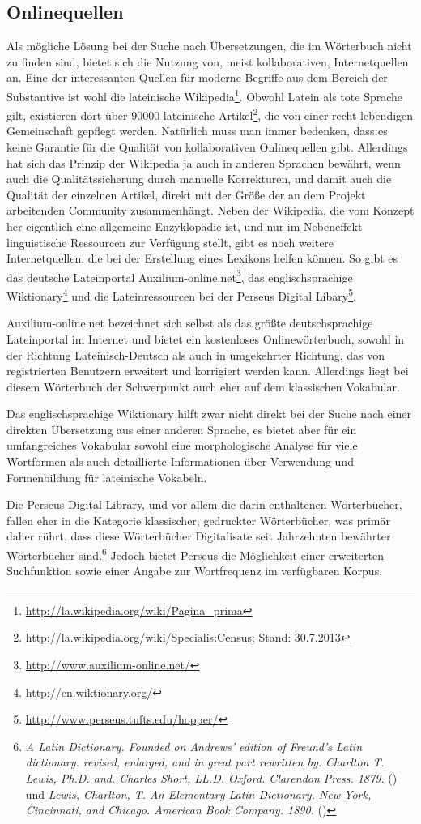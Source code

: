 \subsection{Onlinequellen}
\label{subsec:online}
Als mögliche Lösung bei der Suche nach Übersetzungen, die im Wörterbuch nicht zu finden sind, bietet sich die Nutzung von, meist  kollaborativen, Internetquellen an. Eine der interessanten Quellen für moderne Begriffe aus dem Bereich der Substantive ist wohl die lateinische Wikipedia\footnote{\url{http://la.wikipedia.org/wiki/Pagina\_prima}}. Obwohl Latein als tote Sprache gilt, existieren dort über 90000 lateinische Artikel\footnote{\url{http://la.wikipedia.org/wiki/Specialis:Census}; Stand: 30.7.2013}, die von einer recht lebendigen Gemeinschaft gepflegt werden. Natürlich muss man immer bedenken, dass es keine Garantie für die Qualität von kollaborativen Onlinequellen gibt. Allerdings hat sich das Prinzip der Wikipedia ja auch in anderen Sprachen bewährt, wenn auch die Qualitätssicherung durch manuelle Korrekturen, und damit auch die Qualität der einzelnen Artikel, direkt mit der Größe der an dem Projekt arbeitenden Community zusammenhängt. Neben der Wikipedia, die vom Konzept her eigentlich eine allgemeine Enzyklopädie ist, und nur im Nebeneffekt linguistische Ressourcen zur Verfügung stellt, gibt es noch weitere Internetquellen, die bei der Erstellung eines Lexikons helfen können. So gibt es das deutsche Lateinportal Auxilium-online.net\footnote{\url{http://www.auxilium-online.net/}}, das englischsprachige Wiktionary\footnote{\url{http://en.wiktionary.org/}} und die Lateinressourcen bei der Perseus Digital Libary\footnote{\url{http://www.perseus.tufts.edu/hopper/}}. \par
Auxilium-online.net bezeichnet sich selbst als das größte deutschsprachige Lateinportal im Internet und bietet ein kostenloses Onlinewörterbuch, sowohl in der Richtung Lateinisch-Deutsch als auch in umgekehrter Richtung, das von registrierten Benutzern erweitert und korrigiert werden kann. Allerdings liegt bei diesem Wörterbuch der Schwerpunkt auch eher auf dem klassischen Vokabular. \par
Das englischsprachige Wiktionary hilft zwar nicht direkt bei der Suche nach einer direkten Übersetzung aus einer anderen Sprache, es bietet aber für ein umfangreiches Vokabular sowohl eine morphologische Analyse für viele Wortformen als auch detaillierte Informationen über Verwendung und Formenbildung für lateinische Vokabeln. \par
Die Perseus Digital Library, und vor allem die darin enthaltenen Wörterbücher, fallen eher in die Kategorie klassischer, gedruckter Wörterbücher, was primär daher rührt, dass diese Wörterbücher Digitalisate seit Jahrzehnten bewährter Wörterbücher sind.\footnote{\textit{A Latin Dictionary. Founded on Andrews' edition of Freund's Latin dictionary. revised, enlarged, and in great part rewritten by. Charlton T. Lewis, Ph.D. and. Charles Short, LL.D. Oxford. Clarendon Press. 1879.} (\persalatin) und \textit{Lewis, Charlton, T. An Elementary Latin Dictionary. New York, Cincinnati, and Chicago. American Book Company. 1890.} (\perselemlat)} Jedoch bietet Perseus die Möglichkeit einer erweiterten Suchfunktion sowie einer Angabe zur Wortfrequenz im verfügbaren Korpus. \par

